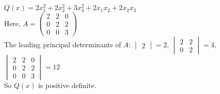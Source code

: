 \documentclass[../main-sheet.tex]{subfiles}
\begin{document}
\begin{ex}
    \(Q(x)=2x_1^2+2x_2^2+3x_3^2+2x_1x_2+2x_2x_3\)\\
    Here, \(A=\begin{pmatrix}
        2&2&0\\
        0&2&2\\
        0&0&3
    \end{pmatrix}\)\\
    The leading principal determinants of \(A\): \(\begin{vmatrix}
        2
    \end{vmatrix}=2\), \(\begin{vmatrix}
        2&2\\
        0&2
    \end{vmatrix}=4\), \(\begin{vmatrix}
        2&2&0\\
        0&2&2\\
        0&0&3
    \end{vmatrix}=12\)\\
    So \(Q(x)\) is positive definite.
\end{ex}
\end{document}
